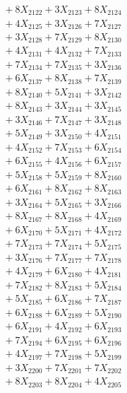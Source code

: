 \documentclass[a4paper,10pt]{article}
\begin{document}
{\begin{align}
&\;  + 8 X_{2122} + 3 X_{2123} + 8 X_{2124} \\[0.3ex]
&\;  + 4 X_{2125} + 3 X_{2126} + 7 X_{2127} \\[0.3ex]
&\;  + 3 X_{2128} + 7 X_{2129} + 8 X_{2130} \\[0.3ex]
&\;  + 4 X_{2131} + 4 X_{2132} + 7 X_{2133} \\[0.3ex]
&\;  + 7 X_{2134} + 7 X_{2135} + 3 X_{2136} \\[0.3ex]
&\;  + 6 X_{2137} + 8 X_{2138} + 7 X_{2139} \\[0.5ex]\allowbreak
&\;  + 8 X_{2140} + 5 X_{2141} + 3 X_{2142} \\[0.3ex]
&\;  + 8 X_{2143} + 3 X_{2144} + 3 X_{2145} \\[0.3ex]
&\;  + 3 X_{2146} + 7 X_{2147} + 3 X_{2148} \\[0.3ex]
&\;  + 5 X_{2149} + 3 X_{2150} + 4 X_{2151} \\[0.3ex]
&\;  + 4 X_{2152} + 7 X_{2153} + 6 X_{2154} \\[0.3ex]
&\;  + 6 X_{2155} + 4 X_{2156} + 6 X_{2157} \\[0.3ex]
&\;  + 5 X_{2158} + 5 X_{2159} + 8 X_{2160} \\[0.3ex]
&\;  + 6 X_{2161} + 8 X_{2162} + 8 X_{2163} \\[0.3ex]
&\;  + 3 X_{2164} + 5 X_{2165} + 3 X_{2166} \\[0.3ex]
&\;  + 8 X_{2167} + 8 X_{2168} + 4 X_{2169} \\[0.5ex]\allowbreak
&\;  + 6 X_{2170} + 5 X_{2171} + 4 X_{2172} \\[0.3ex]
&\;  + 7 X_{2173} + 7 X_{2174} + 5 X_{2175} \\[0.3ex]
&\;  + 3 X_{2176} + 7 X_{2177} + 7 X_{2178} \\[0.3ex]
&\;  + 4 X_{2179} + 6 X_{2180} + 4 X_{2181} \\[0.3ex]
&\;  + 7 X_{2182} + 8 X_{2183} + 5 X_{2184} \\[0.3ex]
&\;  + 5 X_{2185} + 6 X_{2186} + 7 X_{2187} \\[0.3ex]
&\;  + 6 X_{2188} + 6 X_{2189} + 5 X_{2190} \\[0.3ex]
&\;  + 6 X_{2191} + 4 X_{2192} + 6 X_{2193} \\[0.3ex]
&\;  + 7 X_{2194} + 6 X_{2195} + 6 X_{2196} \\[0.3ex]
&\;  + 4 X_{2197} + 7 X_{2198} + 5 X_{2199} \\[0.5ex]\allowbreak
&\;  + 3 X_{2200} + 7 X_{2201} + 7 X_{2202} \\[0.3ex]
&\;  + 8 X_{2203} + 8 X_{2204} + 4 X_{2205} \\[0.3ex]

\end{align}}
\end{document}

